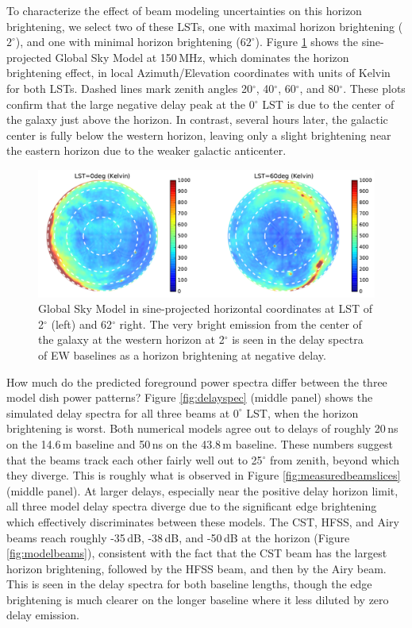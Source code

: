 \documentclass{emulateapj}
\begin{document}
To characterize the effect of beam modeling uncertainties on this horizon brightening, we select two of these LSTs, one with maximal horizon brightening ($2^\circ$), and one with minimal horizon brightening ($62^\circ$). Figure \ref{fig:gsmplots} shows the sine-projected Global Sky Model at 150\,MHz, which dominates the horizon brightening effect, in local Azimuth/Elevation coordinates with units of Kelvin for both LSTs. Dashed lines mark zenith angles 20$^\circ$, 40$^\circ$, 60$^\circ$, and 80$^\circ$. These plots confirm that the large negative delay peak at the 0$^\circ$ LST is due to the center of the galaxy just above the horizon. In contrast, several hours later, the galactic center is fully below the western horizon, leaving only a slight brightening near the eastern horizon due to the weaker galactic anticenter. 

\begin{figure}[t]
\centering
\includegraphics[width=6in]{gsm_kelvin_LST_2deg_and_62deg.pdf}
\caption{Global Sky Model \citep{gsm} in sine-projected horizontal coordinates at LST of 2$^\circ$ (left) and 62$^\circ$ right. The very bright emission from the center of the galaxy at the western horizon at 2$^\circ$ is seen in the delay spectra of EW baselines as a horizon brightening at negative delay.}
\label{fig:gsmplots}
\end{figure}

How much do the predicted foreground power spectra differ between the three model dish power patterns? Figure \ref{fig:delayspec} (middle panel) shows the simulated delay spectra for all three beams at $0^\circ$ LST, when the horizon brightening is worst. Both numerical models agree out to delays of roughly 20\,ns on the 14.6\,m baseline and 50\,ns on the 43.8\,m baseline. These numbers suggest that the beams track each other fairly well out to 25$^\circ$ from zenith, beyond which they diverge. This is roughly what is observed in Figure \ref{fig:measuredbeamslices} (middle panel). At larger delays, especially near the positive delay horizon limit, all three model delay spectra diverge due to the significant edge brightening which effectively discriminates between these models. The CST, HFSS, and Airy beams reach roughly -35\,dB, -38\,dB, and -50\,dB at the horizon (Figure \ref{fig:modelbeams}), consistent with the fact that the CST beam has the largest horizon brightening, followed by the HFSS beam, and then by the Airy beam. This is seen in the delay spectra for both baseline lengths, though the edge brightening is much clearer on the longer baseline where it less diluted by zero delay emission.  
\end{document}
